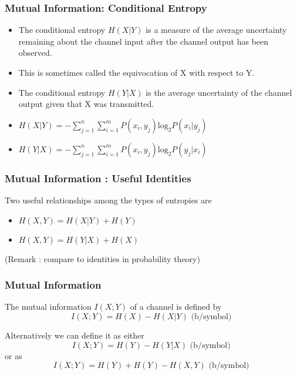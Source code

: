 \documentclass[a4]{beamer}
\begin{document}

\frametitle{Mutual Information: Conditional Entropy}
\begin{itemize}
\item The conditional entropy $H(X|Y)$ is a
measure of the average uncertainty remaining about the channel input after the channel output has
been observed. \item This is sometimes called the equivocation of X with respect to Y.  \item The
conditional entropy $H(Y|X)$ is the average uncertainty of the channel output given that X was
transmitted.
\end{itemize}
\begin{itemize}
\item $H(X| Y)= - \sum ^{n}_{j=1}\sum ^{m}_{i=1} P(x_i,y_j) \mbox{log}_2 P(x_i|y_j)$
\item $H(Y|X)= - \sum ^{n}_{j=1}\sum ^{m}_{i=1} P(x_i,y_j) \mbox{log}_2 P(y_j|x_i)$
\end{itemize}


\frametitle{Mutual Information : Useful Identities}
Two useful relationships among the types of entropies are
\begin{itemize}
\item $H(X,Y)=H(X|Y)+H(Y) $
\item $H(X,Y)=H(Y|X)+H(X) $
\end{itemize}
(Remark : compare to identities in probability theory)



\frametitle{Mutual Information}
The mutual information $I(X; Y)$ of a channel is defined by
\[ I(X; Y) = H(X) -  H(X|Y) \mbox{    (b/symbol) } \]

Alternatively we can define it as either
\[ I(X; Y) = H(Y) -  H(Y|X) \mbox{     (b/symbol) } \]
 or as
\[ I(X; Y) = H(Y)+ H(Y)  - H(X,Y) \mbox{    (b/symbol) } \]


\end{document}
